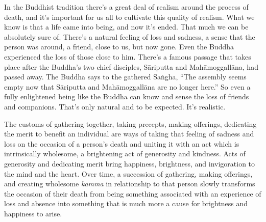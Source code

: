 In the Buddhist tradition there's a great deal of realism around the 
process of death, and it's important for us all to cultivate this 
quality of realism. What we know is that a life came into being, and 
now it's ended. That much we can be absolutely sure of. There's a 
natural feeling of loss and sadness, a sense that the person was 
around, a friend, close to us, but now gone. Even the Buddha 
experienced the loss of those close to him. There's a famous passage 
that takes place after the Buddha's two chief disciples, Sāriputta and 
Mahāmoggallāna, had passed away. The Buddha says to the gathered 
Saṅgha, ``The assembly seems empty now that Sāriputta and 
Mahāmoggallāna are no longer here.'' So even a fully enlightened 
being like the Buddha can know and sense the loss of friends and 
companions. That's only natural and to be expected. It's realistic.

The customs of gathering together, taking precepts, making offerings, 
dedicating the merit to benefit an individual are ways of taking that 
feeling of sadness and loss on the occasion of a person's death and 
uniting it with an act which is intrinsically wholesome, a brightening 
act of generosity and kindness. Acts of generosity and dedicating merit 
bring happiness, brightness, and invigoration to the mind and the 
heart. Over time, a succession of gathering, making offerings, and 
creating wholesome \emph{kamma} in relationship to that person slowly 
transforms the occasion of their death from being something associated 
with an experience of loss and absence into something that is much more 
a cause for brightness and happiness to arise.


